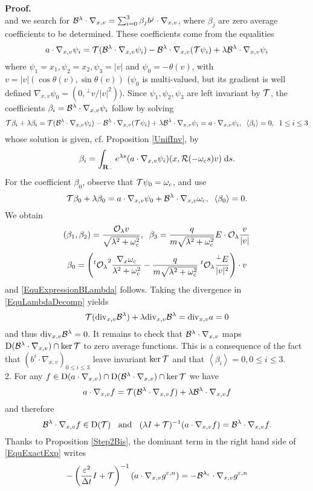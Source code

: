 \documentclass[12pt, a4paper]{article}
\providecommand\mathbb{\bf}
\newcommand\R{{\mathbb R}}
\newcounter{steps}
\newenvironment{proof}[1][]{%
\par\medbreak\setcounter{steps}{0}
{\noindent\bfseries Proof#1. }} {\hfill\fbox{\ }\medbreak}
\newcommand{\bl}[0]{
{\cal B}^\lambda}
\newcommand{\ble}[0]{
{\cal B}^{\lambda _\varepsilon}}
\newcommand{\ol}[0]{
{\cal O}_\lambda}
\newcommand{\radlo}[0]{
\sqrt{\lambda ^2 + \omega _c ^2}}
\newcommand{\eps}[0]{
\varepsilon}
\newcommand{\gen}[0]{
g ^{\varepsilon, n}}
\newcommand{\Divxv}[0]{
\mathrm{div}_{x,v}}
\newcommand{\nxv}[0]{
\nabla_{x,v}}
\newcommand{\ave}[1]{
\left \langle #1 \right \rangle }
\newcommand{\D}[0]{
\mathrm{D}}
\begin{document}
{\begin{proof}
\[\]
and we search for $\bl \cdot \nxv = \sum _{i = 0} ^3 \beta _j b^j \cdot \nxv$, where $\beta _j$ are zero average coefficients to be determined. These coefficients come from the equalities
\[
a\cdot \nxv \psi _i = {\cal T} (\bl \cdot \nxv \psi _i ) - \bl \cdot \nxv ( {\cal T} \psi _i ) + \lambda \bl \cdot \nxv \psi _i 
\]
where $\psi _1 = x_1, \psi _2 = x_2, \psi _3 = |v|$ and $\psi _0 = - \theta (v)$, with $v = |v|(\cos \theta(v), \sin \theta (v))$ ($\psi _0 $ is multi-valued, but its gradient is well defined $\nxv \psi _0 = (0, {^\perp v}/|v|^2)$). Since $\psi_1, \psi _2, \psi _3$ are left invariant by ${\cal T}$, the coefficients $\beta _i = \bl \cdot \nxv \psi _i$ follow by solving 
\[
{\cal T} \beta _i + \lambda \beta _i = {\cal T} ( \bl \cdot \nxv \psi _i ) - \bl \cdot \nxv ( {\cal T} \psi _i ) + \lambda \bl \cdot \nxv \psi _i = a \cdot \nxv \psi _i,\;\;\ave{\beta _i} = 0,\;\;1\leq i \leq 3
\]
whose solution is given, cf. Proposition \ref{UnifInv}, by
\[
\beta _i = \int _{\R_ -} e ^{\lambda s} ( a \cdot \nxv \psi _i ) (x, {\cal R}(-\omega _c s) v)\;\mathrm{d}s.
\]
For the coefficient $\beta _0$, observe that ${\cal T} \psi _0 = \omega _c $, and use
\[
{\cal T} \beta _0 + \lambda \beta _0 = a \cdot \nxv \psi _0 + \bl \cdot \nxv \omega _c,\;\;\ave{\beta _0 } = 0.
\]
We obtain
\[
(\beta _1, \beta _2) = \frac{\ol v}{\radlo},\;\;\beta _3 = \frac{q}{m \radlo} E \cdot \ol \frac{v}{|v|}
\]
\[
\beta _0 = \left ( {^t \ol}^2 \frac{\nabla _x \omega _c}{\lambda ^2 + \omega _c ^2} - \frac{q}{m \radlo} \;{^t \ol } \frac{^\perp E}{|v|^2}     \right ) \cdot v
\]
and \eqref{EquExpressionBLambda} follows. Taking the divergence in \eqref{EquLambdaDecomp} yields
\[
{\cal T} (\Divxv \bl) + \lambda \Divxv \bl = \Divxv a = 0
\]
and thus $\Divxv \bl = 0$. It remains to check that $\bl \cdot \nxv $ maps $\D (\bl \cdot \nxv ) \cap \ker {\cal T}$ to zero average functions. This is a consequence of the fact that $(b^i \cdot \nxv ) _{0 \leq i \leq 3}$ leave invariant $\ker {\cal T} $ and that $\ave{\beta _i}= 0, 0 \leq i \leq 3$. \\
2. For any $f \in \D ( a \cdot \nxv ) \cap \D ( \bl \cdot \nxv ) \cap \ker {\cal T}$ we have
\[
a\cdot \nxv f = {\cal T} ( \bl \cdot \nxv f ) + \lambda \bl \cdot \nxv f 
\]
and therefore
\[
\bl \cdot \nxv f \in \D ({\cal T})\;\;\mbox{ and } \;\;( \lambda I + {\cal T}) ^{-1} ( a \cdot \nxv f) = \bl \cdot \nxv f.
\]
\end{proof}
Thanks to Proposition \ref{Step2Bis}, the dominant term in the right hand side of \eqref{EquExactExp} writes
\[
- \left ( \frac{\eps ^2}{\Delta t} I + {\cal T} \right ) ^{-1} ( a \cdot \nxv \gen) = - \ble \cdot \nxv \gen
\]}
\end{document}
